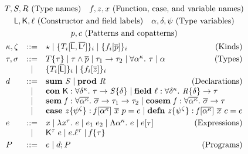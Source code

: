 \begin{gather*}
  T,S,R~\text{(Type names)}\quad f,z,x~\text{(Function, case, and variable names)} \\ \fnlab{L},\fnlab{K},\ell~\text{(Constructor and field labels)}\quad\alpha,\delta,\psi~\text{(Type variables)}\\
  p,c~\text{(Patterns and copatterns)} \\
  \begin{array}{lcl}
    \kappa,\zeta &::=& \kitype{} \mid \kidata{T_i[\seq{\fnlab{L}}, \seq{\fnlab{L}'}]}_i \mid \kicase{f_i[\seq{p}]}_i \qquad\hfill\text{(Kinds)}\\[1mm]
    \tau,\sigma &::=& \tysyn{T}{\tau} \mid \tymatch{\tau}{\seq{p}} \mid \tyarr{\tau_1}{\tau_2} \mid \tyall{\alpha}{\kappa}{\tau} \mid \tyvar{\alpha} \qquad\hfill\text{(Types)}\\
                 &\mid& \tydata{T_i[\seq{\fnlab{L}}]}_i \mid \tycase{f_i[\seq{z}]}_i \\[1mm]
    d &::=& \dsum{S} \mid \dprod{R} \qquad \hfill\text{(Declarations)}\\
        & \mid & \dcon{K}{\delta}{\kappa}{\tau}{S} \mid \dfield{\ell}{\delta}{\kappa}{R}{\tau} \\
                 & \mid & \dsem{f}{\seq{\withki{\alpha}{\kappa}}}{\seq{\sigma}}{\tau_1}{\tau_2} \mid \dcosem{f}{\seq{\withki{\alpha}{\kappa}}}{\seq{\sigma}}{\tau} \\
        & \mid & \dcase{z}{\withki{\psi}{\zeta}}{f}{\seq{\withki{\alpha}{\kappa}}}{\seq{x}}{p}{e} \mid \ddefn{z}{\withki{\psi}{\zeta}}{f}{\seq{\withki{\alpha}{\kappa}}}{\seq{x}}{c}{e} \\[1mm]
    e &::=& \tmvar{x} \mid \tmlam{x}{\tau}{e} \mid \tmapp{e_1}{e_2} \mid \tmtylam{\alpha}{\kappa}{e} \mid \tmtyapp{e}{\tau} \qquad\hfill\text{(Expressions)}\\
           & \mid & \tmcon{K}{\tau}{e} \mid \tmproj{e}{\ell}{\tau} \mid \tmsemapp{f}{\tau} \\[1mm]
    P &::=& e \mid d ; P \qquad\hfill\text{(Programs)}\\
  \end{array}
\end{gather*}

